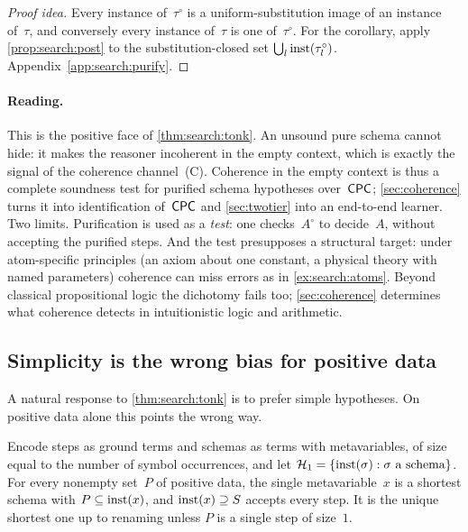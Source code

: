 \begin{proof}[Proof idea]
Every instance of~$\tau^\circ$ is a uniform-substitution image of an instance of~$\tau$, and conversely every instance of~$\tau$ is one of~$\tau^\circ$. For the corollary, apply \cref{prop:search:post} to the substitution-closed set $\bigcup_l\mathrm{inst}(\tau_l^\circ)$. Appendix~\ref{app:search:purify}.
\end{proof}

\paragraph{Reading.}
This is the positive face of \cref{thm:search:tonk}. An unsound pure schema cannot hide: it makes the reasoner incoherent in the empty context, which is exactly the signal of the coherence channel~(C). Coherence in the empty context is thus a complete soundness test for purified schema hypotheses over~$\mathsf{CPC}$; \cref{sec:coherence} turns it into identification of~$\mathsf{CPC}$ and \cref{sec:twotier} into an end-to-end learner. Two limits. Purification is used as a \emph{test}: one checks~$A^\circ$ to decide~$A$, without accepting the purified steps. And the test presupposes a structural target: under atom-specific principles (an axiom about one constant, a physical theory with named parameters) coherence can miss errors as in \cref{ex:search:atoms}. Beyond classical propositional logic the dichotomy fails too; \cref{sec:coherence} determines what coherence detects in intuitionistic logic and arithmetic.

\subsection{Simplicity is the wrong bias for positive data}\label{sec:search:mdl}

A natural response to \cref{thm:search:tonk} is to prefer simple hypotheses. On positive data alone this points the wrong way.

\begin{proposition}\label{prop:search:mdl}
Encode steps as ground terms and schemas as terms with metavariables, of size equal to the number of symbol occurrences, and let $\mathcal{H}_1=\{\mathrm{inst}(\sigma):\sigma\text{ a schema}\}$. For every nonempty set~$P$ of positive data, the single metavariable~$x$ is a shortest schema with $P\subseteq\mathrm{inst}(x)$, and $\mathrm{inst}(x)\supseteq S$ accepts every step. It is the unique shortest one up to renaming unless $P$ is a single step of size~$1$.
\end{proposition}


